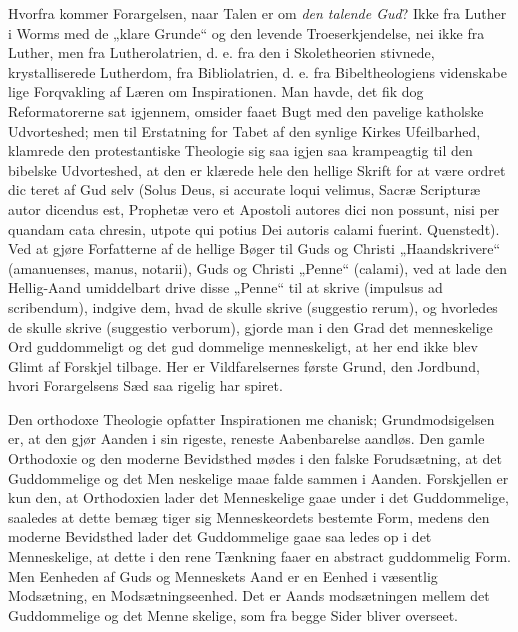 \documentclass[12pt]{book}
\newcommand{\opage}[1]{\marginnote{\footnotesize\textit{[#1]}}}
\begin{document}
Hvorfra kommer Forargelsen, naar Talen er om
\emph{den talende Gud}? Ikke fra Luther i Worms med
de „klare Grunde“ og den levende Troeserkjendelse,
nei ikke fra Luther, men fra Lutherolatrien, d. e. fra
den i Skoletheorien stivnede, krystalliserede Lutherdom,
fra Bibliolatrien, d. e. fra Bibeltheologiens videnskabe\-%
lige Forqvakling af Læren om Inspirationen. Man havde,
det fik dog Reformatorerne sat igjennem, omsider faaet
Bugt med den pavelige katholske Udvorteshed; men til
Erstatning for Tabet af den synlige Kirkes Ufeilbarhed,
klamrede den protestantiske Theologie sig saa igjen saa
krampeagtig til den bibelske Udvorteshed, at den er\-%
klærede hele den hellige Skrift for at være ordret dic\-%
teret af Gud selv (Solus Deus, si accurate loqui velimus,
Sacræ Scripturæ autor dicendus est, Prophetæ vero et
Apostoli autores dici non possunt, nisi per quandam cata\-%
chresin, utpote qui potius Dei autoris calami fuerint.
Quenstedt). Ved at gjøre Forfatterne af de hellige
Bøger til Guds og Christi „Haandskrivere“ (amanuenses,
manus, notarii), Guds og Christi „Penne“ (calami), ved
at lade den Hellig-Aand umiddelbart drive disse „Penne“
til at skrive (impulsus ad scribendum), indgive dem,
hvad de skulle skrive (suggestio rerum), og hvorledes de
skulle skrive (suggestio verborum), gjorde man i den
Grad det menneskelige Ord guddommeligt og det gud\-%
dommelige menneskeligt, at her end ikke blev Glimt af
\opage{184}\setcounter{footnote}{0}%
Forskjel tilbage. Her er Vildfarelsernes første Grund, den
Jordbund, hvori Forargelsens Sæd saa rigelig har spiret.

Den orthodoxe Theologie opfatter Inspirationen me\-%
chanisk; Grundmodsigelsen er, at den gjør Aanden i
sin rigeste, reneste Aabenbarelse aandløs. Den gamle
Orthodoxie og den moderne Bevidsthed mødes i den
falske Forudsætning, at det Guddommelige og det Men\-%
neskelige maae falde sammen i Aanden. Forskjellen er
kun den, at Orthodoxien lader det Menneskelige gaae
under i det Guddommelige, saaledes at dette bemæg\-%
tiger sig Menneskeordets bestemte Form, medens den
moderne Bevidsthed lader det Guddommelige gaae saa\-%
ledes op i det Menneskelige, at dette i den rene Tænkning
faaer en abstract guddommelig Form. Men Eenheden
af Guds og Menneskets Aand er en Eenhed i væsentlig
Modsætning, en Modsætningseenhed. Det er Aands\-%
modsætningen mellem det Guddommelige og det Menne\-%
skelige, som fra begge Sider bliver overseet.
\end{document}
